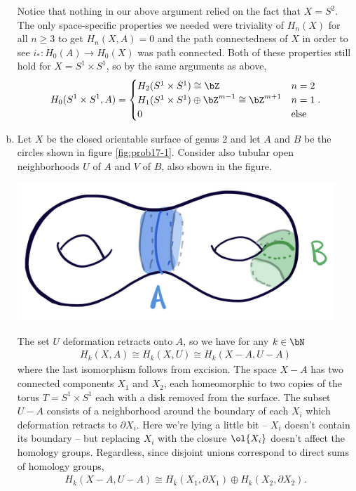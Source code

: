 \begin{homework}[e]
\begin{prf}
\begin{enumerate}[(a)]
      Notice that nothing in our above argument relied on the fact that $X = S^2$. The only space-specific properties we needed were triviality of $H_n(X)$ for all $n \geq 3$ to get $H_n(X,A) = 0$ and the path connectedness of $X$ in order to see $i_*:H_0(A) \to H_0(X)$ was path connected. Both of these properties still hold for $X = S^1\times S^1$, so by the same arguments as above,
      \begin{align*}
        H_0(S^1\times S^1,A) =
        \begin{cases}
          H_2(S^1\times S^1) \cong \bZ & n = 2 \\
          H_1(S^1\times S^1) \oplus \bZ^{m-1} \cong \bZ^{m+1} & n = 1 \\
          0 & \text{else}
        \end{cases}.
      \end{align*}

    \item Let $X$ be the closed orientable surface of genus 2 and let $A$ and $B$ be the circles shown in figure \ref{fig:prob17-1}. Consider also tubular open neighborhoods $U$ of $A$ and $V$ of $B$, also shown in the figure.
    \begin{center}
      \includegraphics[width=12cm]{figures/hwk11-fig1.png}
      \label{fig:prob17-1}
    \end{center}
      The set $U$ deformation retracts onto $A$, so we have for any $k \in \bN$
      \begin{align*}
        H_k(X,A) \cong H_k(X,U) \cong H_k(X - A, U - A)
      \end{align*}
      where the last isomorphism follows from excision. The space $X - A$ has two connected components $X_1$ and $X_2$, each homeomorphic to two copies of the torus $T = S^1\times S^1$ each with a disk removed from the surface. The subset $U - A$ consists of a neighborhood around the boundary of each $X_i$ which deformation retracts to $\partial X_i$. Here we're lying a little bit -- $X_i$ doesn't contain its boundary -- but replacing $X_i$ with the closure $\ol{X_i}$ doesn't affect the homology groups. Regardless, since disjoint unions correspond to direct sums of homology groups,
      \begin{align*}
        H_k(X-A,U-A) \cong H_k(X_1,\partial X_1) \oplus H_k(X_2,\partial X_2).
      \end{align*}


\end{enumerate}
\end{prf}
\end{homework}
